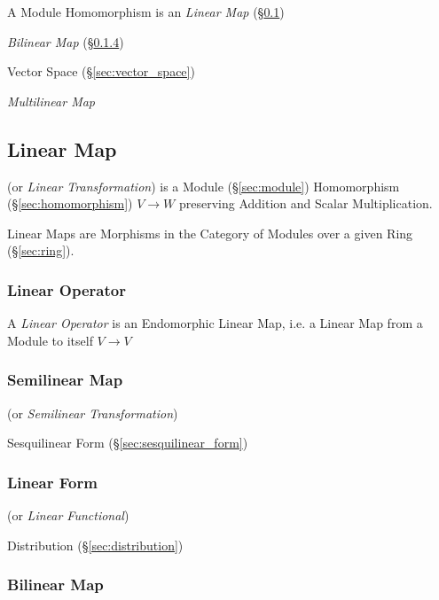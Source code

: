 A Module Homomorphism is an \emph{Linear Map} (\S\ref{sec:linear_map})

\emph{Bilinear Map} (\S\ref{sec:bilinear_map})

Vector Space (\S\ref{sec:vector_space})

\emph{Multilinear Map}



\subsection{Linear Map}\label{sec:linear_map}

(or \emph{Linear Transformation}) is a Module (\S\ref{sec:module})
Homomorphism (\S\ref{sec:homomorphism}) $V \rightarrow W$ preserving
Addition and Scalar Multiplication.

Linear Maps are Morphisms in the Category of Modules over a given Ring
(\S\ref{sec:ring}).



\subsubsection{Linear Operator}\label{sec:linear_operator}

A \emph{Linear Operator} is an Endomorphic Linear Map, i.e. a Linear
Map from a Module to itself $V \rightarrow V$



\subsubsection{Semilinear Map}\label{sec:semilinear_map}

(or \emph{Semilinear Transformation})

Sesquilinear Form (\S\ref{sec:sesquilinear_form})



\subsubsection{Linear Form}\label{sec:linear_form}

(or \emph{Linear Functional})

Distribution (\S\ref{sec:distribution})



\subsubsection{Bilinear Map}\label{sec:bilinear_map}


